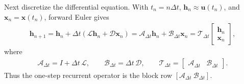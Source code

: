 \documentclass[11pt]{article}
\begin{document}
Next discretize the differential equation.  With
$t_n=n\Delta t$, $\bm{h}_n\approx\bm{u}(t_n)$, and
$\bm{x}_n=\bm{x}(t_n)$, forward Euler gives
\begin{equation}
  \begin{split}
  \bm{h}_{n+1}
  =\bm{h}_n+\Delta t
    \left(\mathcal L\bm{h}_n+\mathcal D\bm{x}_n\right)
  =\mathcal A_{\Delta t}\bm{h}_n
   +\mathcal B_{\Delta t}\bm{x}_n
  =\mathcal T_{\Delta t}
   \begin{bmatrix}\bm{h}_n\\ \bm{x}_n\end{bmatrix},
  \label{eq:lti-rnn}
  \end{split}
\end{equation}
where
\begin{equation}
  \begin{split}
  \mathcal A_{\Delta t}=I+\Delta t\,\mathcal L,
  \qquad
  \mathcal B_{\Delta t}=\Delta t\,\mathcal D,
  \qquad
  \mathcal T_{\Delta t}
  =
  \begin{bmatrix}
    \mathcal A_{\Delta t} & \mathcal B_{\Delta t}
  \end{bmatrix}.
  \label{eq:discrete-transition}
  \end{split}
\end{equation}
Thus the one-step recurrent operator is the block row
$[\mathcal A_{\Delta t}\ \mathcal B_{\Delta t}]$.
\end{document}
